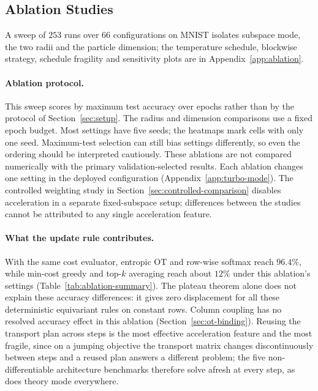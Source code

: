 \subsection{Ablation Studies}\label{sec:ablation}

A sweep of $253$ runs over $66$ configurations on MNIST isolates subspace mode, the two
radii and the particle dimension; the temperature schedule, blockwise strategy,
schedule fragility and sensitivity plots are in Appendix~\ref{app:ablation}.

\paragraph{Ablation protocol.}
This sweep scores by maximum test accuracy over epochs rather than by the protocol of
Section~\ref{sec:setup}. The radius and dimension comparisons use a fixed epoch budget. Most
settings have five seeds; the heatmaps mark cells with only one seed. Maximum-test selection can still bias settings differently,
so even the ordering should be interpreted cautiously. These ablations are
not compared numerically with the primary validation-selected results.
Each ablation changes one setting in the deployed configuration
(Appendix~\ref{app:turbo-mode}). The controlled weighting study in
Section~\ref{sec:controlled-comparison} disables acceleration in a separate
fixed-subspace setup; differences between the studies cannot be attributed
to any single acceleration feature.

\paragraph{What the update rule contributes.}
With the same cost evaluator, entropic OT and row-wise softmax reach
$96.4\%$, while min-cost greedy and top-$k$ averaging reach about $12\%$
under this ablation's settings (Table~\ref{tab:ablation-summary}).
The plateau theorem alone does not explain these accuracy differences: it gives
zero displacement for all these deterministic equivariant rules on constant
rows. Column coupling has no resolved accuracy effect in this ablation
(Section~\ref{sec:ot-binding}). Reusing the transport plan across steps
is the most effective acceleration feature and the most fragile, since on a jumping
objective the transport matrix changes discontinuously between steps and a reused plan
answers a different problem; the five non-differentiable architecture benchmarks
therefore solve afresh at every step, as does theory mode everywhere.

